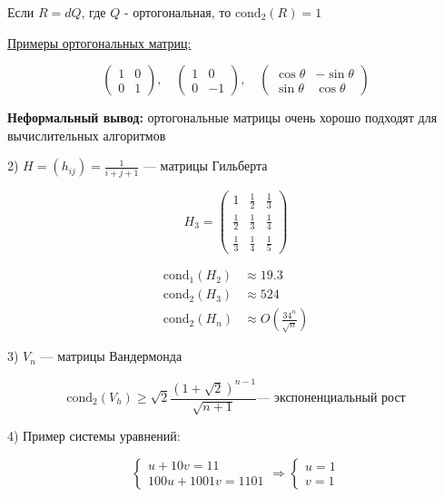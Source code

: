 
Если \( R = dQ \), где \( Q \) - ортогональная, то \(\text{cond}_2(R) = 1\)

\underline{Примеры ортогональных матриц:}

\[
\begin{pmatrix}
1 & 0 \\
0 & 1
\end{pmatrix},
\quad
\begin{pmatrix}
1 & 0 \\
0 & -1
\end{pmatrix},
\quad
\begin{pmatrix}
\cos\theta & -\sin\theta \\
\sin\theta & \cos\theta
\end{pmatrix}
\]

\textbf{Неформальный вывод:} ортогональные матрицы очень хорошо подходят для вычислительных алгоритмов

2) \( H = (h_{ij}) = \frac{1}{i+j+1} \) — матрицы Гильберта

\[ H_3 = 
\begin{pmatrix}
1 & \frac{1}{2} & \frac{1}{3} \\
\frac{1}{2} & \frac{1}{3} & \frac{1}{4} \\
\frac{1}{3} & \frac{1}{4} & \frac{1}{5}
\end{pmatrix} \]

\[ \begin{aligned}
\text{cond}_1 (H_2) &\approx 19.3 \\
\text{cond}_2 (H_3) &\approx 524 \\
\text{cond}_2 (H_n) &\approx O\left(\frac{34^n}{\sqrt{n}}\right)
\end{aligned} \]

3) \( V_n \) — матрицы Вандермонда

\[ \text{cond}_2 (V_h) \geq \sqrt{2} \frac{(1 + \sqrt{2})^{n-1}}{\sqrt{n+1}} \text{— экспоненциальный рост}\]

4) Пример системы уравнений:

\[ \begin{cases}
u + 10v = 11 \\
100u + 1001v = 1101
\end{cases}
\Rightarrow 
\begin{cases}
u = 1 \\
v = 1
\end{cases} \]

